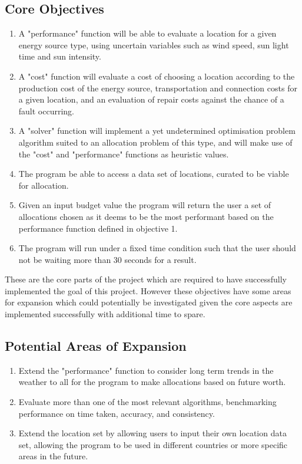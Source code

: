 \documentclass[twoside]{article}
\begin{document}
\subsection{Core Objectives}
\begin{enumerate}
    \item A "performance" function will be able to evaluate a location for a given energy source type, using uncertain variables such as wind speed, sun light time and sun intensity.
    \item A "cost" function will evaluate a cost of choosing a location according to the production cost of the energy source, transportation and connection costs for a given location, and an evaluation of repair costs against the chance of a fault occurring.
    \item A "solver" function will implement a yet undetermined optimisation problem algorithm suited to an allocation problem of this type, and will make use of the "cost" and "performance" functions as heuristic values.
    \item The program be able to access a  data set of locations, curated to be viable for allocation.
    \item Given an input budget value the program will return the user a set of allocations chosen as it deems to be the most performant based on the performance function defined in objective 1.
    \item The program will run under a fixed time condition such that the user should not be waiting more than 30 seconds for a result.
\end{enumerate}

These are the core parts of the project which are required to have successfully implemented the goal of this project. However these objectives have some areas for expansion which could potentially be investigated given the core aspects are implemented successfully with additional time to spare.
\subsection{Potential Areas of Expansion}
\begin{enumerate}
    \item Extend the "performance" function to consider long term trends in the weather to all for the program to make allocations based on future worth.
    \item Evaluate more than one of the most relevant algorithms, benchmarking performance on time taken, accuracy, and consistency.
    \item Extend the location set by allowing users to input their own location data set, allowing the program to be used in different countries or more specific areas in the future.
\end{enumerate}
\end{document}
